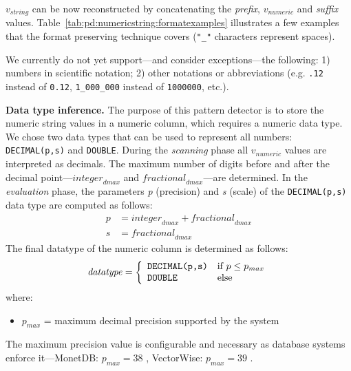 \(v_{string}\) can be now reconstructed by concatenating the \textit{prefix}, \(v_{numeric}\) and \textit{suffix} values. Table~\ref{tab:pd:numericstring:formatexamples} illustrates a few examples that the format preserving technique covers (\verb|"_"| characters represent spaces).



We currently do not yet support---and consider exceptions---the following: 1) numbers in scientific notation; 2) other notations or abbreviations (e.g. \verb|.12| instead of \verb|0.12|, \verb|1_000_000| instead of \verb|1000000|, etc.).

\textbf{Data type inference.} The purpose of this pattern detector is to store the numeric string values in a numeric column, which requires a numeric data type. We chose two data types that can be used to represent all numbers: \verb|DECIMAL(p,s)| and \verb|DOUBLE|. During the \textit{scanning} phase all \(v_{numeric}\) values are interpreted as decimals. The maximum number of digits before and after the decimal point---\(\mathit{integer}_{dmax}\) and \(\mathit{fractional}_{dmax}\)---are determined.  In the \textit{evaluation} phase, the parameters \textit{p} (precision) and \textit{s} (scale) of the \verb|DECIMAL(p,s)| data type are computed as follows:
\begin{equation}
\label{eq:pd:numericstrings:precisionscale}
\begin{array}{ll}
    p &= \mathit{integer}_{dmax} + \mathit{fractional}_{dmax}\\
    s &= \mathit{fractional}_{dmax}
\end{array}
\end{equation}
The final datatype of the numeric column is determined as follows:
\begin{equation}
\label{eq:pd:numericstrings:datatype}
\mathit{datatype} = 
\left\{
\begin{array}{ll}
    \verb|DECIMAL(p,s)| & \mbox{if } p \leq p_{max}\\
    \verb|DOUBLE| & \mbox{else}
\end{array}
\right.
\end{equation}
where:
\begin{itemize}
    \item[] \(p_{max}\) = maximum decimal precision supported by the system
\end{itemize}
The maximum precision value is configurable and necessary as database systems enforce it---MonetDB: \(p_{max}=38\) \cite{monetdbdatatypes}, VectorWise: \(p_{max}=39\) \cite{vectorwisedecimal}.

